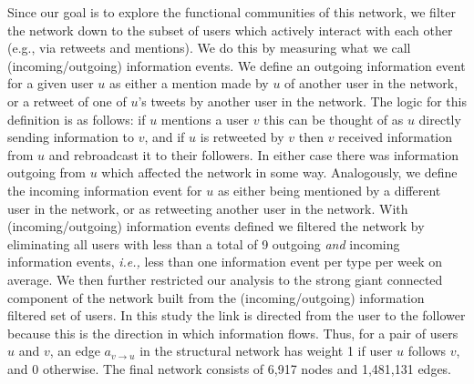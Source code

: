 Since our goal is to explore the functional communities of this network, we filter the network down to the subset of users which actively interact with each other (e.g., via retweets and mentions). We do this by measuring what we call (incoming/outgoing) information events. We define an outgoing information event for a given user $u$ as either a mention made by $u$ of another user in the network, or a retweet of one of $u$'s tweets by another user in the network. The logic for this definition is as follows: if $u$ mentions a user $v$ this can be thought of as $u$ directly sending information to $v$, and if $u$ is retweeted by $v$ then $v$ received information from $u$ and rebroadcast it to their followers. In either case there was information outgoing from $u$ which affected the network in some way. Analogously, we define the incoming information event for $u$ as either being mentioned by a different user in the network, or as retweeting another user in the network.
With (incoming/outgoing) information events defined we filtered the network by eliminating all users with less than a total of 9 outgoing \emph{and} incoming information events, {\it i.e.,} less than one information event per type per week on average. 
We then further restricted our analysis to the strong giant connected component of the network built from the (incoming/outgoing) information filtered set of users. %
In this study the link is directed from the user to the follower because this is the direction in which information flows. Thus, for a pair of users $u$ and $v$, an edge $a_{v \to u}$ in the structural network has weight 1 if user $u$ follows $v$, and 0 otherwise. The final network consists of 6,917 nodes and 1,481,131 edges.

